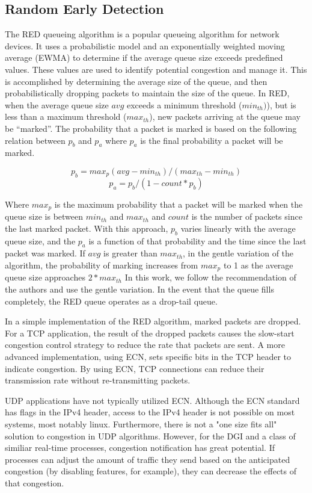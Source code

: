 \subsection{Random Early Detection}
The RED queueing algorithm is a popular queueing algorithm for network devices.
It uses a probabilistic model and an exponentially weighted moving average (EWMA) to determine if the average queue size exceeds predefined values.
These values are used to identify potential congestion and manage it.
This is accomplished by determining the average size of the queue, and then probabilistically dropping packets to maintain the size of the queue.
In RED, when the average queue size $avg$ exceeds a minimum threshold ($min_{th})$), but is less than a maximum threshold ($max_{th}$), new packets arriving at the queue may be ``marked''.
The probability that a packet is marked is based on the following relation between $p_{b}$ and $p_{a}$ where $p_{a}$ is the final probability a packet will be marked.

\begin{equation}
p_{b} = max_p (avg - min_{th}) / (max_{th}-min_{th})
\end{equation}
\begin{equation}
p_{a} = p_{b} / (1-count * p_b)
\end{equation}

Where $max_p$ is the maximum probability that a packet will be marked when the queue size is between $min_{th}$ and $max_{th}$ and $count$ is the number of packets since the last marked packet.
With this approach, $p_{b}$ varies linearly with the average queue size, and the $p_{a}$ is a function of that probability and the time since the last packet was marked.
If $avg$ is greater than $max_{th}$, in the gentle variation of the algorithm, the probability of marking increases from $max_p$ to 1 as the average queue size approaches $2*max_{th}$
In this work, we follow the recommendation of the authors and use the gentle variation.
In the event that the queue fills completely, the RED queue operates as a drop-tail queue.

In a simple implementation of the RED algorithm, marked packets are dropped.
For a TCP application, the result of the dropped packets causes the slow-start congestion control strategy to reduce the rate that packets are sent.
A more advanced implementation, using ECN, sets specific bits in the TCP header to indicate congestion.
By using ECN, TCP connections can reduce their transmission rate without re-transmitting packets.

UDP applications have not typically utilized ECN.
Although the ECN standard has flags in the IPv4 header, access to the IPv4 header is not possible on most systems, most notably linux.
Furthermore, there is not a "one size fits all" solution to congestion in UDP algorithms.
However, for the DGI and a class of similiar real-time processes, congestion notification has great potential.
If processes can adjust the amount of traffic they send based on the anticipated congestion (by disabling features, for example), they can decrease the effects of that congestion.

